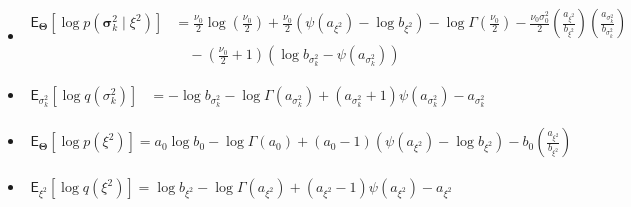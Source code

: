 \begin{itemize}
\begin{itemize}
            \item 

    $
    \begin{aligned}
    \mathsf{E}_{\bm{\Theta}}\left[\log p(\bm{\sigma}_k^2 \mid \xi^2)\right]&=\tfrac{\nu_0}{2}\log\left(\tfrac{\nu_0}{2}\right)
+\tfrac{\nu_0}{2}\left(\psi(a_{\xi^2})-\log b_{\xi^2}\right)-\log\Gamma\left(\tfrac{\nu_0}{2}\right)-\tfrac{\nu_0\sigma^2_0}{2}\left(\tfrac{a_{\xi^2}}{b_{\xi^2}}\right)\left(\tfrac{a_{\sigma_k^2}}{b_{\sigma_k^2}}\right)\\
&\quad -\left(\tfrac{\nu_0}{2}+1\right)\left(\log b_{\sigma_k^2}-\psi(a_{\sigma_k^2})\right)
    \end{aligned}
    $

            \item 

    $
    \begin{aligned}
    \mathsf{E}_{\sigma_k^2}\!\left[\log q(\sigma_k^2)\right]&=-\log b_{\sigma_k^2}-\log\Gamma(a_{\sigma_k^2})+(a_{\sigma_k^2}+1)\psi(a_{\sigma_k^2})-a_{\sigma_k^2}
    \end{aligned}
    $

            \item 

    $
    \begin{aligned}
    \mathsf{E}_{\bm{\Theta}}\left[\log p(\xi^2)\right]=a_0\log b_0-\log\Gamma(a_0)
+(a_0-1)\left(\psi(a_{\xi^2})-\log b_{\xi^2}\right)
-b_0\left(\tfrac{a_{\xi^2}}{b_{\xi^2}}\right)
    \end{aligned}
    $

            \item 

    $
    \begin{aligned}
    \mathsf{E}_{\xi^2}\left[\log q(\xi^2)\right]=\log b_{\xi^2}-\log\Gamma(a_{\xi^2})+(a_{\xi^2}-1)\psi(a_{\xi^2})-a_{\xi^2}
    \end{aligned}
    $

    
\end{itemize}

\end{itemize}


